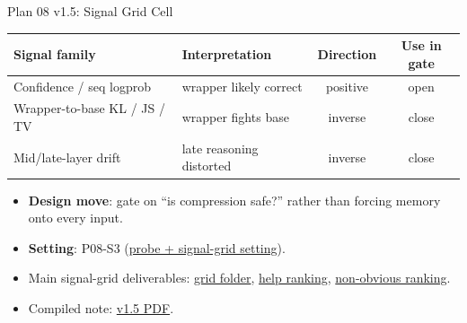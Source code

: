 \begin{frame}{Plan 08 v1.5: Signal Grid Cell}
  \small
  \begin{table}
    \centering
    \begin{tabular}{llcc}
      \toprule
      Signal family & Interpretation & Direction & Use in gate \\
      \midrule
      Confidence / seq logprob & wrapper likely correct & positive & open \\
      Wrapper-to-base KL / JS / TV & wrapper fights base & inverse & close \\
      Mid/late-layer drift & late reasoning distorted & inverse & close \\
      \bottomrule
    \end{tabular}
  \end{table}
  \begin{itemize}
    \item \textbf{Design move}: gate on ``is compression safe?'' rather than
      forcing memory onto every input.
    \item \textbf{Setting}: P08-S3
      (\href{https://github.com/BDeMo/research-notes/blob/main/notes/plans/08-model-outputs-delta-w/settings.md\#p08-s3--v15-intrinsic-signal-probe}{probe + signal-grid setting}).
    \item Main signal-grid deliverables:
      \href{https://github.com/BDeMo/research-notes/tree/main/notes/plans/08-model-outputs-delta-w/grids-2026-06-04}{grid folder},
      \href{https://github.com/BDeMo/research-notes/blob/main/notes/plans/08-model-outputs-delta-w/grids-2026-06-04/rank_help.png}{help ranking},
      \href{https://github.com/BDeMo/research-notes/blob/main/notes/plans/08-model-outputs-delta-w/grids-2026-06-04/rank_interesting.png}{non-obvious ranking}.
    \item Compiled note:
      \href{https://github.com/BDeMo/research-notes/blob/main/notes/plans/08-model-outputs-delta-w/v1.5-intrinsic-gating-study-2026-06-04.pdf}{v1.5 PDF}.
  \end{itemize}
\end{frame}

